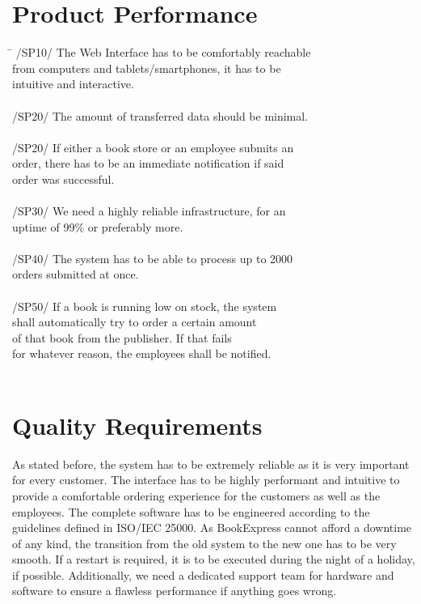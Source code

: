 \documentclass[a4paper,draft]{article}
\begin{document}
\section{Product Performance}
\begin{tabbing}
\hspace{3cm}\=\kill
	/SP10/ \> The Web Interface has to be comfortably reachable\\
	\> from computers and tablets/smartphones, it has to be \\
	\> intuitive and interactive.\\
	\\
	/SP20/ \> The amount of transferred data should be minimal.\\
	\\
	/SP20/ \> If either a book store or an employee submits an \\
	\> order, there has to be an immediate notification if said\\
	\> order was successful.\\
	\\
	/SP30/ \> We need a highly reliable infrastructure, for an \\
	\> uptime of 99\% or preferably more. \\
	\\
	/SP40/ \> The system has to be able to process up to 2000\\
	\> orders submitted at once.\\
	\\
	/SP50/ \> If a book is running low on stock, the system\\
	\> shall automatically try to order a certain amount \\
	\> of that book from the publisher.  If that fails\\
	\> for whatever reason, the employees shall be notified.\\
	\\
\end{tabbing} 
\section{Quality Requirements}
As stated before, the system has to be extremely reliable as it is very important for every customer. The interface has to be highly performant and intuitive to provide a comfortable ordering experience for the customers as well as the employees. The complete software has to be engineered according to the guidelines defined in ISO/IEC 25000. As BookExpress cannot afford a downtime of any kind, the transition from the old system to the new one has to be very smooth. If a restart is required, it is to be executed during the night of a holiday, if possible. Additionally, we need a dedicated support team for hardware and software to ensure a flawless performance if anything goes wrong.
\end{document}
